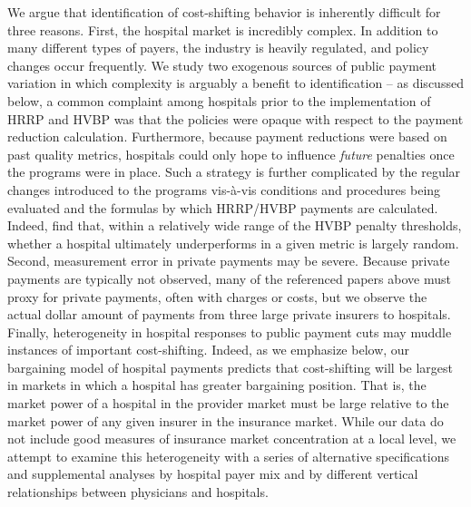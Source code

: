 \documentclass[12pt]{article}
\begin{document}
We argue that identification of cost-shifting behavior is inherently difficult for three reasons.  First, the hospital market is incredibly complex.  In addition to many different types of payers, the industry is heavily regulated, and policy changes occur frequently.  We study two exogenous sources of public payment variation in which complexity is arguably a benefit to identification -- as discussed below, a common complaint among hospitals prior to the implementation of HRRP and HVBP was that the policies were opaque with respect to the payment reduction calculation.  Furthermore, because payment reductions were based on past quality metrics, hospitals could only hope to influence \textit{future} penalties once the programs were in place. Such a strategy is further complicated by the regular changes introduced to the programs vis-\`a-vis conditions and procedures being evaluated and the formulas by which HRRP/HVBP payments are calculated. Indeed, \cite{friedson2016} find that, within a relatively wide range of the HVBP penalty thresholds, whether a hospital ultimately underperforms in a given metric is largely random. Second, measurement error in private payments may be severe.  Because private payments are typically not observed, many of the referenced papers above must proxy for private payments, often with charges or costs, but we observe the actual dollar amount of payments from three large private insurers to hospitals.  Finally, heterogeneity in hospital responses to public payment cuts may muddle instances of important cost-shifting.  Indeed, as we emphasize below, our bargaining model of hospital payments predicts that cost-shifting will be largest in markets in which a hospital has greater bargaining position.  That is, the market power of a hospital in the provider market must be large relative to the market power of any given insurer in the insurance market.  While our data do not include good measures of insurance market concentration at a local level, we attempt to examine this heterogeneity with a series of alternative specifications and supplemental analyses by hospital payer mix and by different vertical relationships between physicians and hospitals.
\end{document}
